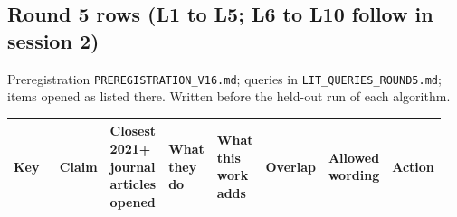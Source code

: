 \subsection*{Round 5 rows (L1 to L5; L6 to L10 follow in session 2)}

Preregistration \texttt{PREREGISTRATION\_V16.md}; queries in \texttt{LIT\_QUERIES\_ROUND5.md}; items opened as listed there. Written before the held-out run of each algorithm.

{\scriptsize\raggedright
\begin{longtable}{p{0.119\linewidth}p{0.119\linewidth}p{0.119\linewidth}p{0.119\linewidth}p{0.119\linewidth}p{0.119\linewidth}p{0.119\linewidth}p{0.119\linewidth}}
\toprule
Key & Claim & Closest 2021+ journal articles opened & What they do & What this work adds & Overlap & Allowed wording & Action \\
\midrule
\endhead
\bottomrule
\end{longtable}}

